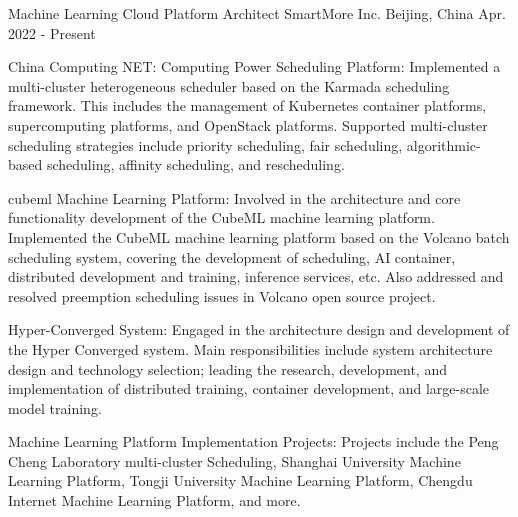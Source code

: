 

\begin{cventries}

  \cventry
    {Machine Learning Cloud Platform Architect} %
    {SmartMore Inc.} %
    {Beijing, China} %
    {Apr. 2022 - Present} %
    {
      \begin{cvitems} %
        \item {China Computing NET: Computing Power Scheduling Platform: Implemented a multi-cluster heterogeneous scheduler based on the Karmada scheduling framework. This includes the management of Kubernetes container platforms, supercomputing platforms, and OpenStack platforms. Supported multi-cluster scheduling strategies include priority scheduling, fair scheduling, algorithmic-based scheduling, affinity scheduling, and rescheduling.}
        \item {cubeml Machine Learning Platform: Involved in the architecture and core functionality development of the CubeML machine learning platform. Implemented the CubeML machine learning platform based on the Volcano batch scheduling system, covering the development of scheduling, AI container, distributed development and training, inference services, etc. Also addressed and resolved preemption scheduling issues in Volcano open source project.}
        \item {Hyper-Converged System: Engaged in the architecture design and development of the Hyper Converged system. Main responsibilities include system architecture design and technology selection; leading the research, development, and implementation of distributed training, container development, and large-scale model training.}
        \item {Machine Learning Platform Implementation Projects: Projects include the Peng Cheng Laboratory multi-cluster Scheduling, Shanghai University Machine Learning Platform, Tongji University Machine Learning Platform, Chengdu Internet Machine Learning Platform, and more.}
      \end{cvitems}
    }


\end{cventries}
